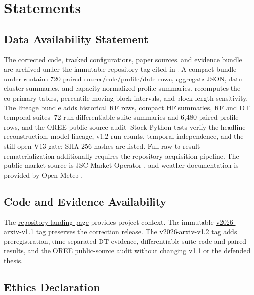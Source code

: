 \section{Statements}

\subsection{Data Availability Statement}

The corrected code, tracked configurations, paper sources, and evidence bundle are archived under the immutable repository tag cited in \cite{fefelov2026repo}. A compact bundle under  contains 720 paired source/role/profile/date rows, aggregate JSON, date-cluster summaries, and capacity-normalized profile summaries.  recomputes the co-primary tables, percentile moving-block intervals, and block-length sensitivity. The lineage bundle adds historical RF rows, compact HF summaries, RF and DT temporal suites, 72-run differentiable-suite summaries and 6,480 paired profile rows, and the OREE public-source audit. Stock-Python tests verify the headline reconstruction, model lineage, v1.2 run counts, temporal independence, and the still-open V13 gate; SHA-256 hashes are listed. Full raw-to-result rematerialization additionally requires the repository acquisition pipeline. The public market source is JSC Market Operator \cite{oree2026dam}, and weather documentation is provided by Open-Meteo \cite{openmeteo2026archive}.

\subsection{Code and Evidence Availability}

The \href{https://github.com/ilyafefelov/Diploma}{repository landing page} provides project context. The immutable \href{https://github.com/ilyafefelov/Diploma/tree/v2026-arxiv-v1.1}{v2026-arxiv-v1.1} tag preserves the correction release. The \href{https://github.com/ilyafefelov/Diploma/tree/v2026-arxiv-v1.2}{v2026-arxiv-v1.2} tag adds preregistration, time-separated DT evidence, differentiable-suite code and paired results, and the OREE public-source audit without changing v1.1 or the defended thesis.

\subsection{Ethics Declaration}

